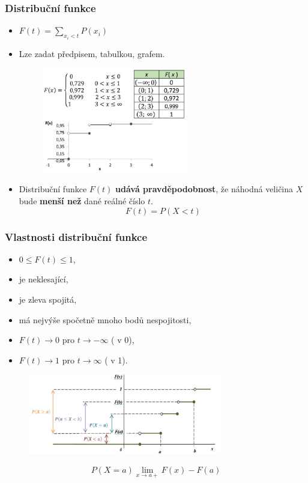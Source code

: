 \subsubsection{Distribuční funkce}
				\begin{itemize}
					\item $F(t) = \sum_{x_i < t} P(x_i)$
					\item Lze zadat předpisem, tabulkou, grafem.
					\begin{figure}[H]
					\centering
					\includegraphics[width=0.6\textwidth]{assets/11_dnv_dist}
				\end{figure}
				\item Distribuční funkce $F(t)$ \textbf{udává pravděpodobnost}, že náhodná veličina $X$ bude \textbf{menší než} dané reálné číslo $t$. $$F(t) = P(X < t)$$
			\end{itemize}
\subsubsection*{Vlastnosti distribuční funkce}
				\begin{itemize}
					\item $0 \leq F(t) \leq 1$,
					\item je neklesající,
					\item je zleva spojitá,
					\item má nejvýše spočetně mnoho bodů nespojitosti,
					\item $F(t) \rightarrow 0 $ pro $ t \rightarrow -\infty $ ( v 0),
					\item $F(t) \rightarrow 1 $ pro $ t \rightarrow \infty $ ( v 1).
				\end{itemize}
				\begin{figure}[H]
					\centering
					\includegraphics[width=0.75\textwidth]{assets/11_vztah_prav_dist_dnv2}
				\end{figure}
				$$P(X = a) \lim_{x \to a+} F(x) - F(a)$$

